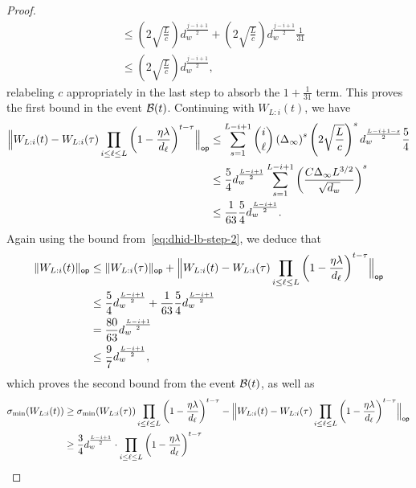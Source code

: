 \begin{proof}
\begin{align*}
    & \leq  \left(2\sqrt{\frac{L}{c}}\right) d_w^{\frac{j-i+1}{2}} + \left(2\sqrt{\frac{L}{c}}\right) d_w^{\frac{j-i+1}{2}}
		\frac{1}{31} \\
    &\leq  \left(2\sqrt{\frac{L}{c}}\right) d_w^{\frac{j-i+1}{2}},
  \end{align*}
  relabeling $c$ appropriately in the last step to absorb the $1 + \frac{1}{31}$ term.
  This proves the first bound in the event $\cB(t)$. Continuing with $W_{L:i}(t)$, we have
  \begin{align}
    \opnorm[\Big]{W_{L:i}(t) - W_{L:i}(\tau) \prod_{i \leq \ell \leq L} \left(1 - \frac{\eta \lambda}{d_{\ell}}\right)^{t - \tau}}
    & \leq
    \sum_{s = 1}^{L-i+1} \binom{i}{\ell}\left(\Delta_{\infty}\right)^{s}
    \left(2 \sqrt{\frac{L}{c}}\right)^{s} \dhid^{\frac{L-i+1-s}{2}} \frac{5}{4}
            \notag \\
                                          & \leq
      \frac{5}{4}  d_w^{\frac{L-i+1}{2}} 
      \sum_{s = 1}^{L-i+1} \left(\frac{C \Delta_{\infty} L^{3/2}}{\sqrt{\dhid}}\right)^{s} \notag \\
                                          & \leq
      \frac{1}{63}  \frac{5}{4}  d_w^{\frac{L-i+1}{2}}.
  \end{align}
  Again using the bound from~\eqref{eq:dhid-lb-step-2}, we deduce that
  \begin{align*}
    \opnorm{W_{L:i}(t)} &\leq \opnorm{W_{L:i}(\tau)} + \opnorm[\Big]{W_{L:i}(t) - W_{L:i}(\tau) \prod_{i \leq \ell \leq L}\left(1 - \frac{\eta \lambda}{d_{\ell}}\right)^{t - \tau}} \\
                      &  \leq  \frac{5}{4} d_w^{\frac{L-i+1}{2}} + \frac{1}{63} \frac{5}{4}  d_w^{\frac{L-i+1}{2}} \\ 
                      & = \frac{80}{63}  d_w^{\frac{L-i+1}{2}} \\
                      & \leq \frac{9}{7}  d_w^{\frac{L-i+1}{2}},
  \end{align*}
  which proves the second bound from the event $\cB(t)$, as well as
\begin{align*}
  \sigma_{\min}(W_{L:i}(t)) &\geq  \sigma_{\min}(W_{L:i}(\tau)) \prod_{i \leq \ell \leq L} \left(1 - \frac{\eta \lambda}{d_{\ell}}\right)^{t - \tau} - 
  \opnorm[\Big]{W_{L:i}(t) - W_{L:i}(\tau) \prod_{i \leq \ell \leq L}\left(1 - \frac{\eta \lambda}{d_{\ell}}\right)^{t - \tau}} \\
                            & \geq  \frac{3}{4} d_w^{\frac{L-i+1}{2}} \cdot \prod_{i \leq \ell \leq L} \left(1 - \frac{\eta \lambda}{d_{\ell}}\right)^{t - \tau}

\end{align*}
\end{proof}
